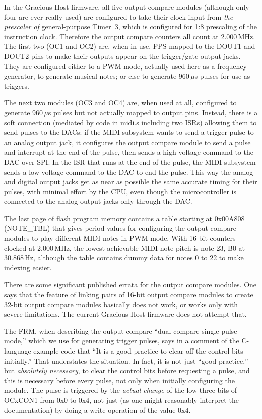 In the Gracious Host firmware, all five output compare modules (although
only four are ever really used) are configured to take their clock input
from \emph{the prescaler of} general-purpose Timer~3, which is configured
for 1:8 prescaling of the instruction clock.  Therefore the output compare
counters all count at 2.000\,MHz.  The first two (OC1 and OC2) are, when in
use, PPS mapped to the DOUT1 and DOUT2 pins to make their outputs appear on
the trigger/gate output jacks.  They are configured either to a PWM mode,
actually used here as a frequency generator, to generate musical notes; or
else to generate 960\,$\mu$s pulses for use as triggers.

The next two modules (OC3 and OC4) are, when used at all, configured to
generate 960\,$\mu$s pulses but not actually mapped to output pins. 
Instead, there is a soft connection (mediated by code in midi.s including
two ISRs) allowing them to send pulses to the DACs: if the MIDI subsystem
wants to send a trigger pulse to an analog output jack, it configures the
output compare module to send a pulse and interrupt at the end of the pulse,
then sends a high-voltage command to the DAC over SPI.  In the ISR that runs
at the end of the pulse, the MIDI subsystem sends a low-voltage command to
the DAC to end the pulse.  This way the analog and digital output jacks get
as near as possible the same accurate timing for their pulses, with minimal
effort by the CPU, even though the microcontroller is connected to the
analog output jacks only through the DAC.

The last page of flash program memory contains a table starting at 0x00A808
(NOTE\_TBL) that gives period values for configuring the output compare
modules to play different MIDI notes in PWM mode.  With 16-bit counters
clocked at 2.000\,MHz, the lowest achievable MIDI note pitch is note 23, B0
at 30.868\,Hz, although the table contains dummy data for notes 0 to 22 to
make indexing easier.

There are some significant published errata for the output compare modules. 
One says that the feature of linking pairs of 16-bit output compare
modules to create 32-bit output compare modules basically does not work, or
works only with severe limitations.  The current Gracious Host firmware does
not attempt that.

The FRM, when describing the output compare ``dual compare single pulse
mode,'' which we use for generating trigger pulses, says in a comment of the
C-language example code that ``It is a good practice to clear off the
control bits initially.''  That understates the situation.  In fact, it is
not just ``good practice,'' but \emph{absolutely necessary}, to clear the
control bits before requesting a pulse, and this is necessary before every
pulse, not only when initially configuring the module.  The pulse is
triggered by the \emph{actual change} of the low three bits of OCxCON1 from
0x0 to 0x4, not just (as one might reasonably interpret the documentation)
by doing a write operation of the value 0x4.


